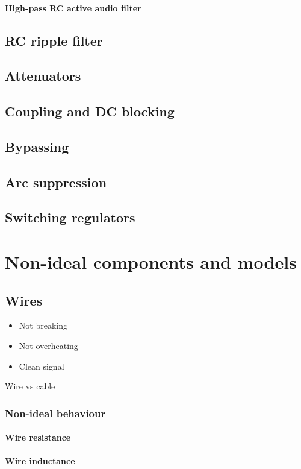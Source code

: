\documentclass{report}
\begin{document}
\subsubsection{High-pass RC active audio filter}
\section{RC ripple filter}
\section{Attenuators}
\section{Coupling and DC blocking}
\section{Bypassing}
\section{Arc suppression}
\section{Switching regulators}


\chapter{Non-ideal components and models}
\section{Wires}
\begin{itemize}
\item Not breaking
\item Not overheating
\item Clean signal
\end{itemize}
Wire vs cable
\subsection{Non-ideal behaviour}
\subsubsection{Wire resistance}
\subsubsection{Wire inductance}
\end{document}
